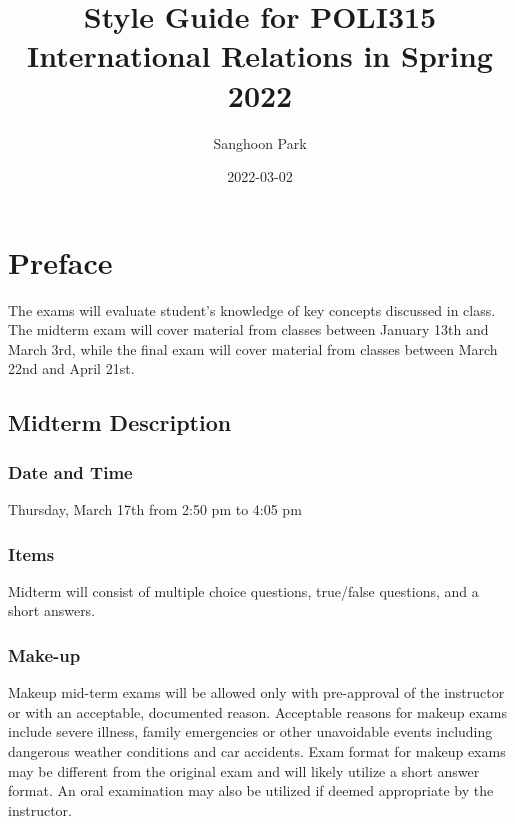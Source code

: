 \documentclass[
]{book}
\title{Style Guide for POLI315 International Relations in Spring 2022}
\author{Sanghoon Park}
\date{2022-03-02}
\begin{document}
\maketitle

{
\setcounter{tocdepth}{1}
\tableofcontents
}
\hypertarget{preface}{%
\chapter*{Preface}\label{preface}}

The exams will evaluate student's knowledge of key concepts discussed in class. The midterm exam will cover material from classes between January 13th and March 3rd, while the final exam will cover material from classes between March 22nd and April 21st.

\hypertarget{midterm-description}{%
\section*{Midterm Description}\label{midterm-description}}

\hypertarget{date-and-time}{%
\subsection*{Date and Time}\label{date-and-time}}

Thursday, March 17th from 2:50 pm to 4:05 pm

\hypertarget{items}{%
\subsection*{Items}\label{items}}

Midterm will consist of multiple choice questions, true/false questions, and a short answers.

\hypertarget{make-up}{%
\subsection*{Make-up}\label{make-up}}

Makeup mid-term exams will be allowed only with pre-approval of the instructor or with an acceptable, documented reason. Acceptable reasons for makeup exams include severe illness, family emergencies or other unavoidable events including dangerous weather conditions and car accidents. Exam format for makeup exams may be different from the original exam and will likely utilize a short answer format. An oral examination may also be utilized if deemed appropriate by the instructor.
\end{document}
